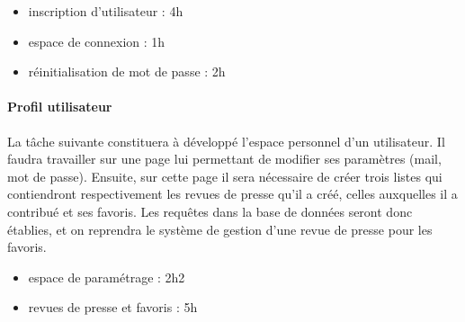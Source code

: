 			\begin{itemize}
				\item inscription d'utilisateur : 4h
				\item espace de connexion : 1h
				\item réinitialisation de mot de passe : 2h
			\end{itemize}

		\paragraph{Profil utilisateur}
			La tâche suivante constituera à développé l'espace personnel d'un utilisateur. Il faudra travailler sur une page lui permettant de modifier ses paramètres (mail, mot de passe). Ensuite, sur cette page il sera nécessaire de créer trois listes qui contiendront respectivement les revues de presse qu'il a créé, celles auxquelles il a contribué et ses favoris. Les requêtes dans la base de données seront donc établies, et on reprendra le système de gestion d'une revue de presse pour les favoris.

			\begin{itemize}
				\item espace de paramétrage : 2h2
				\item revues de presse et favoris : 5h
			\end{itemize}
